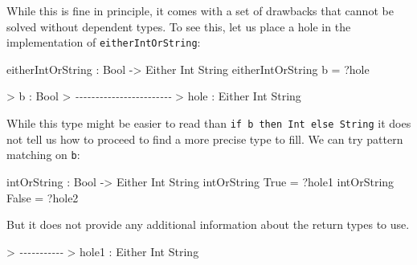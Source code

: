 \documentclass[
]{article}
\newenvironment{Shaded}{}{}
\newcommand{\CommentTok}[1]{\textcolor[rgb]{0.38,0.63,0.69}{\textit{#1}}}
\newcommand{\DataTypeTok}[1]{\textcolor[rgb]{0.56,0.13,0.00}{#1}}
\newcommand{\NormalTok}[1]{#1}
\newcommand{\OperatorTok}[1]{\textcolor[rgb]{0.40,0.40,0.40}{#1}}
\newcommand{\OtherTok}[1]{\textcolor[rgb]{0.00,0.44,0.13}{#1}}
\begin{document}
While this is fine in principle, it comes with a set of drawbacks that
cannot be solved without dependent types. To see this, let us place a
hole in the implementation of \texttt{eitherIntOrString}:

\begin{Shaded}
\begin{Highlighting}[]
\NormalTok{eitherIntOrString }\OperatorTok{:} \DataTypeTok{Bool} \OtherTok{{-}\textgreater{}} \DataTypeTok{Either} \DataTypeTok{Int} \DataTypeTok{String}
\NormalTok{eitherIntOrString b }\OtherTok{=} \OperatorTok{?}\NormalTok{hole}
\end{Highlighting}
\end{Shaded}

\begin{Shaded}
\begin{Highlighting}[]
\OperatorTok{\textgreater{}}\NormalTok{ b }\OperatorTok{:} \DataTypeTok{Bool}
\OperatorTok{\textgreater{}} \CommentTok{{-}{-}{-}{-}{-}{-}{-}{-}{-}{-}{-}{-}{-}{-}{-}{-}{-}{-}{-}{-}{-}{-}{-}{-}}
\OperatorTok{\textgreater{}}\NormalTok{ hole }\OperatorTok{:} \DataTypeTok{Either} \DataTypeTok{Int} \DataTypeTok{String}
\end{Highlighting}
\end{Shaded}

While this type might be easier to read than
\texttt{if\ b\ then\ Int\ else\ String} it does not tell us how to
proceed to find a more precise type to fill. We can try pattern matching
on \texttt{b}:

\begin{Shaded}
\begin{Highlighting}[]
\NormalTok{intOrString\textquotesingle{} }\OperatorTok{:} \DataTypeTok{Bool} \OtherTok{{-}\textgreater{}} \DataTypeTok{Either} \DataTypeTok{Int} \DataTypeTok{String}
\NormalTok{intOrString\textquotesingle{} }\DataTypeTok{True} \OtherTok{=} \OperatorTok{?}\NormalTok{hole1}
\NormalTok{intOrString\textquotesingle{} }\DataTypeTok{False} \OtherTok{=} \OperatorTok{?}\NormalTok{hole2}
\end{Highlighting}
\end{Shaded}

But it does not provide any additional information about the return
types to use.

\begin{Shaded}
\begin{Highlighting}[]
\OperatorTok{\textgreater{}} \CommentTok{{-}{-}{-}{-}{-}{-}{-}{-}{-}{-}{-}}
\OperatorTok{\textgreater{}}\NormalTok{ hole1 }\OperatorTok{:} \DataTypeTok{Either} \DataTypeTok{Int} \DataTypeTok{String}
\end{Highlighting}
\end{Shaded}
\end{document}
